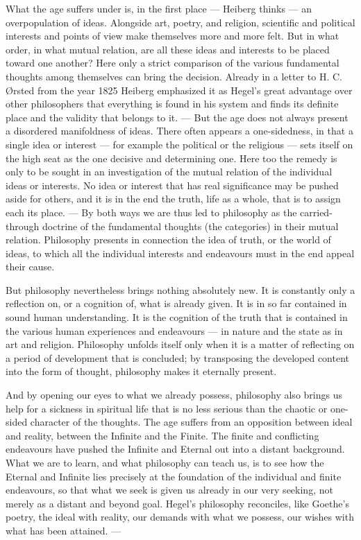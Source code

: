 \documentclass[12pt,a4paper]{book}
\newcommand{\opage}[1]{\marginnote{\footnotesize\textit{[#1]}}}
\begin{document}
What the age suffers under is, in the first place --- Heiberg thinks --- an overpopulation of
ideas. Alongside art, poetry, and religion, scientific and political interests and points of
view make themselves more and more felt. But in what order, in what mutual relation, are all
these ideas and interests to be placed toward one another? Here only a strict comparison of
the various fundamental thoughts among themselves can bring the decision. Already in a letter
to H. C. Ørsted from the year 1825 Heiberg emphasized it as Hegel's great advantage over
other philosophers that everything is found in his system and finds its definite place and
the validity that belongs to it. --- But the age does not always present a disordered
manifoldness of ideas. There often appears a one-sidedness, in that a single idea or interest
--- for example the political or the religious --- sets itself on the high seat as the one
decisive and determining one. Here too the remedy is only to be sought in an investigation of
the mutual relation of the individual ideas or interests. No idea or interest that has real
significance may be pushed aside for others, and it is in the end the truth, life as a whole,
that is to assign each its place. --- By both ways we are thus led to philosophy as the
carried-through doctrine of the fundamental thoughts (\opage{131}the categories) in their mutual
relation. Philosophy presents in connection the idea of truth, or the world of ideas, to
which all the individual interests and endeavours must in the end appeal their cause.

But philosophy nevertheless brings nothing absolutely new. It is constantly only a reflection
on, or a cognition of, what is already given. It is in so far contained in sound human
understanding. It is the cognition of the truth that is contained in the various human
experiences and endeavours --- in nature and the state as in art and religion. Philosophy
unfolds itself only when it is a matter of reflecting on a period of development that is
concluded; by transposing the developed content into the form of thought, philosophy makes it
eternally present.

And by opening our eyes to what we already possess, philosophy also brings us help for a
sickness in spiritual life that is no less serious than the chaotic or one-sided character of
the thoughts. The age suffers from an opposition between ideal and reality, between the
Infinite and the Finite. The finite and conflicting endeavours have pushed the Infinite and
Eternal out into a distant background. What we are to learn, and what philosophy can teach us,
is to see how the Eternal and Infinite lies precisely at the foundation of the individual and
finite endeavours, so that what we seek is given us already in our very seeking, not merely as
a distant and beyond goal. Hegel's philosophy reconciles, like Goethe's poetry, the ideal with
reality, our demands with what we possess, our wishes with what has been attained. ---
\end{document}
